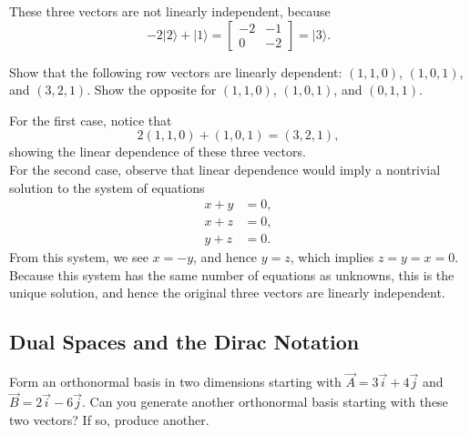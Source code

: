\documentclass[../principles-of-quantum-mechanics.tex]{subfiles}
\begin{document}
\begin{questions}
\begin{solution}
	These three vectors are not linearly independent, because
	\[
		{-2}|2\rangle + |1\rangle = \begin{bmatrix}
		-2 & -1 \\ 0 & -2
		\end{bmatrix} = |3\rangle.
	\]
\end{solution}

\question Show that the following row vectors are linearly dependent: $(1, 1, 0)$, $(1, 0, 1)$, and $(3, 2, 1)$. Show the opposite for $(1, 1, 0)$, $(1, 0, 1)$, and $(0, 1, 1)$.

\begin{solution}
	For the first case, notice that
	\[
		2(1, 1, 0) + (1, 0, 1) = (3, 2, 1),
	\]
	showing the linear dependence of these three vectors. \\
	
	For the second case, observe that linear dependence would imply a nontrivial solution to the system of equations
	\begin{align*}
		x + y &= 0, \\
		x + z &= 0, \\
		y + z &= 0.
	\end{align*}
	From this system, we see $x = -y$, and hence $y = z$, which implies $z = y = x = 0$. Because this system has the same number of equations as unknowns, this is the unique solution, and hence the original three vectors are linearly independent.
\end{solution}

\setcounter{subsection}{2}
\setcounter{question}{0}
\subsection{Dual Spaces and the Dirac Notation}
\question Form an orthonormal basis in two dimensions starting with $\vec{A} = 3\vec{i} + 4\vec{j}$ and $\vec{B} = 2\vec{i} - 6\vec{j}$. Can you generate another orthonormal basis starting with these two vectors? If so, produce another.


\end{questions}
\end{document}
